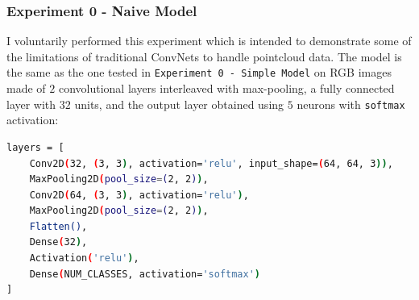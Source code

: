 \documentclass[11pt,a4paper]{article}
\begin{document}
\subsubsection{Experiment 0 - Naive Model}
I voluntarily performed this experiment which is intended to demonstrate some of the limitations of traditional ConvNets to handle pointcloud data. The model is the same as the one tested in \texttt{Experiment 0 - Simple Model} on RGB images made of $2$ convolutional layers interleaved with max-pooling, a fully connected layer with $32$ units, and the output layer obtained using $5$ neurons with \texttt{softmax} activation:
\begin{lstlisting}[language=bash,frame=single]
layers = [
    Conv2D(32, (3, 3), activation='relu', input_shape=(64, 64, 3)),
    MaxPooling2D(pool_size=(2, 2)),
    Conv2D(64, (3, 3), activation='relu'),
    MaxPooling2D(pool_size=(2, 2)),
    Flatten(),
    Dense(32),
    Activation('relu'),
    Dense(NUM_CLASSES, activation='softmax')
]
\end{lstlisting}
\end{document}
